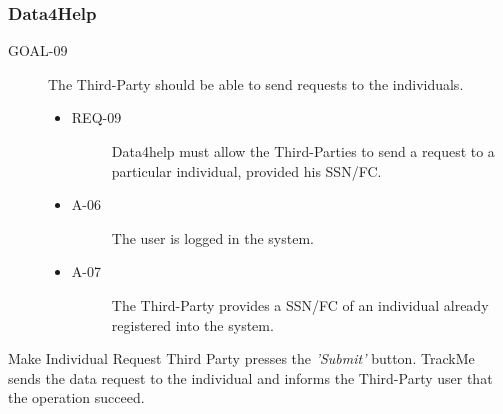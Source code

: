 \documentclass[a4paper]{article}
\newcommand{\requirement}{\ding{229}}%
\begin{document}
           
        \subsubsection{Data4Help}
      
            \begin{description}
        	\item[GOAL-09] The Third-Party should be able to send requests to the individuals. 
            	\begin{itemize}
            	    \item[\requirement]
                	\begin{description}
                	\item[REQ-09] Data4help must allow the Third-Parties to send a request to a particular individual, provided his SSN/FC. 
                	\end{description}
                	\item
                	\begin{description}
                	\item[A-06] The user is logged in the system.
                	\end{description}
                	\item
                	\begin{description}
                	\item[A-07] The Third-Party provides a SSN/FC of an individual already registered into the system.
                	\end{description}
                	\end{itemize}
        \end{description}
      
        \begin{usecase}{ Make Individual Request}
        {Third Party presses the \textit{'Submit'} button.}
        {TrackMe sends the data request to the individual and informs the Third-Party user that the operation succeed.}
        \end{usecase}
        
\end{document}
